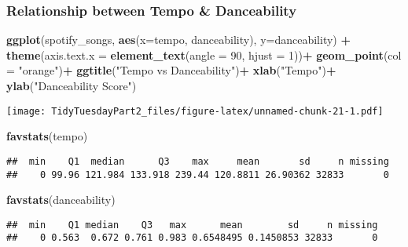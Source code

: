 \documentclass[
]{article}
\newenvironment{Shaded}{\begin{snugshade}}{\end{snugshade}}
\newcommand{\DataTypeTok}[1]{\textcolor[rgb]{0.13,0.29,0.53}{#1}}
\newcommand{\DecValTok}[1]{\textcolor[rgb]{0.00,0.00,0.81}{#1}}
\newcommand{\KeywordTok}[1]{\textcolor[rgb]{0.13,0.29,0.53}{\textbf{#1}}}
\newcommand{\NormalTok}[1]{#1}
\newcommand{\OperatorTok}[1]{\textcolor[rgb]{0.81,0.36,0.00}{\textbf{#1}}}
\newcommand{\StringTok}[1]{\textcolor[rgb]{0.31,0.60,0.02}{#1}}
\begin{document}
\hypertarget{relationship-between-tempo-danceability}{%
\subsubsection{Relationship between Tempo \&
Danceability}\label{relationship-between-tempo-danceability}}

\begin{Shaded}
\begin{Highlighting}[]
\KeywordTok{ggplot}\NormalTok{(spotify_songs, }\KeywordTok{aes}\NormalTok{(}\DataTypeTok{x=}\NormalTok{tempo, }
\NormalTok{                          danceability), }\DataTypeTok{y=}\NormalTok{danceability) }\OperatorTok{+}\StringTok{  }
\StringTok{  }\KeywordTok{theme}\NormalTok{(}\DataTypeTok{axis.text.x =} \KeywordTok{element_text}\NormalTok{(}\DataTypeTok{angle =} \DecValTok{90}\NormalTok{, }\DataTypeTok{hjust =} \DecValTok{1}\NormalTok{))}\OperatorTok{+}
\StringTok{  }\KeywordTok{geom_point}\NormalTok{(}\DataTypeTok{col =} \StringTok{"orange"}\NormalTok{)}\OperatorTok{+}
\StringTok{  }\KeywordTok{ggtitle}\NormalTok{(}\StringTok{"Tempo vs Danceability"}\NormalTok{)}\OperatorTok{+}
\StringTok{  }\KeywordTok{xlab}\NormalTok{(}\StringTok{"Tempo"}\NormalTok{)}\OperatorTok{+}
\StringTok{  }\KeywordTok{ylab}\NormalTok{(}\StringTok{"Danceability Score"}\NormalTok{)}
\end{Highlighting}
\end{Shaded}

\texttt{[image: TidyTuesdayPart2\_files/figure-latex/unnamed-chunk-21-1.pdf]}

\begin{Shaded}
\begin{Highlighting}[]
\KeywordTok{favstats}\NormalTok{(tempo)}
\end{Highlighting}
\end{Shaded}

\begin{verbatim}
##  min    Q1  median      Q3    max     mean       sd     n missing
##    0 99.96 121.984 133.918 239.44 120.8811 26.90362 32833       0
\end{verbatim}

\begin{Shaded}
\begin{Highlighting}[]
\KeywordTok{favstats}\NormalTok{(danceability)}
\end{Highlighting}
\end{Shaded}

\begin{verbatim}
##  min    Q1 median    Q3   max      mean        sd     n missing
##    0 0.563  0.672 0.761 0.983 0.6548495 0.1450853 32833       0
\end{verbatim}
\end{document}
